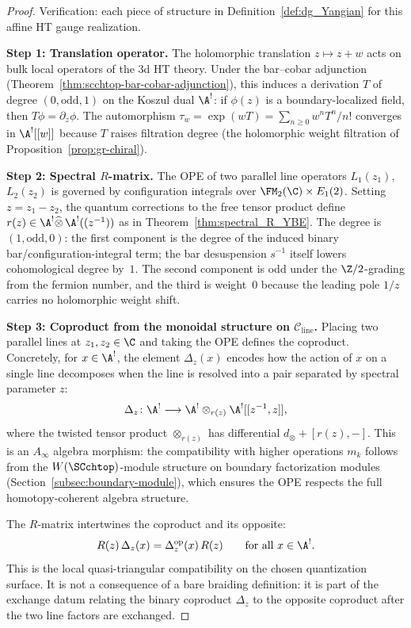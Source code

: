 \begin{proof}
Verification: each piece of structure in Definition~\ref{def:dg_Yangian}
for this affine HT gauge realization.

\medskip
\noindent\textbf{Step 1: Translation operator.}
The holomorphic translation $z \mapsto z + w$ acts on bulk local operators of the 3d HT theory. Under the bar--cobar adjunction (Theorem~\ref{thm:scchtop-bar-cobar-adjunction}), this induces a derivation $T$ of degree $(0,\text{odd},1)$ on the Koszul dual $\A^!$: if $\phi(z)$ is a boundary-localized field, then $T\phi = \partial_z \phi$. The automorphism $\tau_w = \exp(wT) = \sum_{n \geq 0} w^n T^n / n!$ converges in $\A^![[w]]$ because $T$ raises filtration degree (the holomorphic weight filtration of Proposition~\ref{prop:gr-chiral}).

\medskip
\noindent\textbf{Step 2: Spectral $R$-matrix.}
The OPE of two parallel line operators $L_1(z_1)$, $L_2(z_2)$ is governed by configuration integrals over $\FM_2(\C) \times E_1(2)$. Setting $z = z_1 - z_2$, the quantum corrections to the free tensor product define $r(z) \in \A^! \widehat{\otimes}\, \A^!((z^{-1}))$ as in Theorem~\ref{thm:spectral_R_YBE}. The degree is $(1, \text{odd}, 0)$: the first component is the degree of the induced binary bar/configuration-integral term; the bar desuspension $s^{-1}$ itself lowers cohomological degree by~$1$. The second component is odd under the $\Z/2$-grading from the fermion number, and the third is weight~$0$ because the leading pole $1/z$ carries no holomorphic weight shift.

\medskip
\noindent\textbf{Step 3: Coproduct from the monoidal structure on $\mathcal{C}_{\mathrm{line}}$.}
Placing two parallel lines at $z_1, z_2 \in \C$ and taking the OPE defines the coproduct. Concretely, for $x \in \A^!$, the element $\Delta_z(x)$ encodes how the action of $x$ on a single line decomposes when the line is resolved into a pair separated by spectral parameter $z$:
\[
\Delta_z \colon \A^! \longrightarrow \A^! \otimes_{r(z)} \A^![[z^{-1}, z]],
\]
where the twisted tensor product $\otimes_{r(z)}$ has differential $d_{\otimes} + [r(z), -]$. This is an $A_\infty$ algebra morphism: the compatibility with higher operations $m_k$ follows from the $W(\SCchtop)$-module structure on boundary factorization modules (Section~\ref{subsec:boundary-module}), which ensures the OPE respects the full homotopy-coherent algebra structure.

The $R$-matrix intertwines the coproduct and its opposite:
\[
R(z)\,\Delta_z(x) = \Delta_z^{\mathrm{op}}(x)\, R(z) \qquad \text{for all } x \in \A^!.
\]
This is the local quasi-triangular compatibility on the chosen
quantization surface. It is not a consequence of a bare braiding
definition: it is part of the exchange datum relating the binary
coproduct \(\Delta_z\) to the opposite coproduct after the two line
factors are exchanged.


\end{proof}
